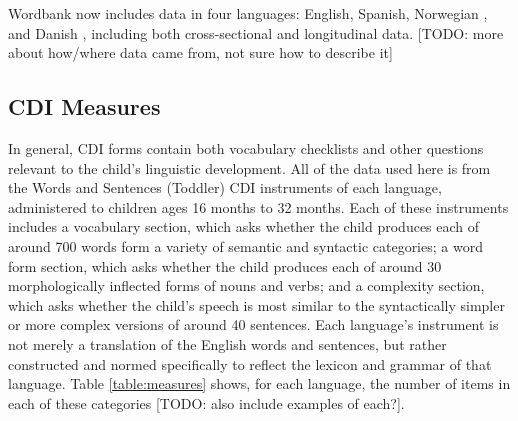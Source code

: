 \documentclass[10pt,letterpaper]{article}
\begin{document}
Wordbank now includes data in four languages: English, Spanish, Norwegian \cite{kristoffersen2013,simonsen2014}, and Danish \cite{andersen2006}, including both cross-sectional and longitudinal data.
[TODO: more about how/where data came from, not sure how to describe it]


\subsection{CDI Measures}

In general, CDI forms contain both vocabulary checklists and other questions relevant to the child's linguistic development. All of the data used here is from the Words and Sentences (Toddler) CDI instruments of each language, administered to children ages 16 months to 32 months. Each of these instruments includes a vocabulary section, which asks whether the child produces each of around 700 words form a variety of semantic and syntactic categories; a word form section, which asks whether the child produces each of around 30 morphologically inflected forms of nouns and verbs; and a complexity section, which asks whether the child's speech is most similar to the syntactically simpler or more complex versions of around 40 sentences. Each language's instrument is not merely a translation of the English words and sentences, but rather constructed and normed specifically to reflect the lexicon and grammar of that language. Table \ref{table:measures} shows, for each language, the number of items in each of these categories [TODO: also include examples of each?].
\end{document}
